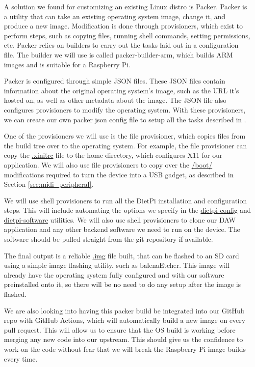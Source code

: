 A solution we found for customizing an existing Linux distro is Packer. Packer is a
utility that can take an existing operating system image, change it, and produce a new
image. Modification is done through provisioners, which exist to perform steps, such as
copying files, running shell commands, setting permissions, etc. Packer relies on builders
to carry out the tasks laid out in a configuration file. The builder we will use is called
packer-builder-arm, which builds ARM images and is suitable for a Raspberry Pi.

Packer is configured through simple JSON files. These JSON files contain information about
the original operating system's image, such as the URL it's hosted on, as well as other
metadata about the image. The JSON file also configures provisioners to modify the
operating system. With these provisioners, we can create our own packer json config file to
setup all the tasks described in .

One of the provisioners we will use is the file provisioner, which copies files from the
build tree over to the operating system. For example, the file provisioner can copy the
\url{.xinitrc} file to the home directory, which configures X11 for our application.
We will also use file provisioners to copy over the \url{/boot/} modifications required to
turn the device into a USB gadget, as described in Section \ref{sec:midi_peripheral}.

We will use shell provisioners to run all the DietPi installation and configuration steps.
This will include automating the options we specify in the \url{dietpi-config} and
\url{dietpi-software} utilities. We will also use shell provisioners to clone our DAW
application and any other backend software we need to run on the device. The software
should be pulled straight from the git repository if available.

The final output is a reliable \url{.img} file built, that can be flashed to an SD card
using a simple image flashing utility, such as balenaEtcher. This image will already have
the operating system fully configured and with our software preinstalled onto it, so there
will be no need to do any setup after the image is flashed.

We are also looking into having this packer build be integrated into our GitHub repo with
GitHub Actions, which will automatically build a new image on every pull request. This
will allow us to ensure that the OS build is working before merging any new code into our
upstream. This should give us the confidence to work on the code without fear that we will
break the Raspberry Pi image builds every time.

